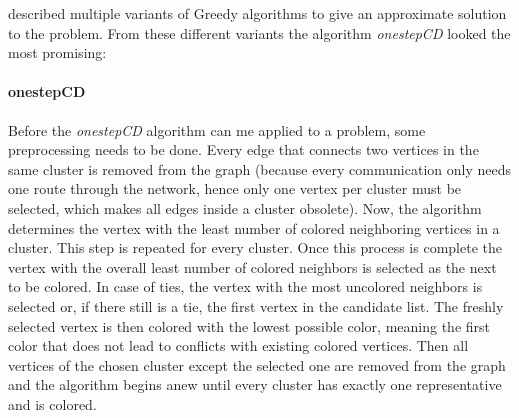 \documentclass[paper=a4,fontsize=12pt]{scrartcl}
\begin{document}
\citet*{Li2000} described multiple variants of Greedy algorithms to give an approximate solution to the problem. From these different variants the algorithm \emph{onestepCD} looked the most promising:


\paragraph{onestepCD}{
\label{sec:construct}
Before the \emph{onestepCD} algorithm can me applied to a problem, some preprocessing needs to be done. Every edge that connects two vertices in the same cluster is removed from the graph (because every communication only needs one route through the network, hence only one vertex per cluster must be selected, which makes all edges inside a cluster obsolete). Now, the algorithm determines the vertex with the least number of colored neighboring vertices in a cluster. This step is repeated for every cluster. Once this process is complete the vertex with the overall least number of colored neighbors is selected as the next to be colored. In case of ties, the vertex with the most uncolored neighbors is selected or, if there still is a tie, the first vertex in the candidate list. The freshly selected vertex is then colored with the lowest possible color, meaning the first color that does not lead to conflicts with existing colored vertices. Then all vertices of the chosen cluster except the selected one are removed from the graph and the algorithm begins anew until every cluster has exactly one representative and is colored. 

}
\end{document}

